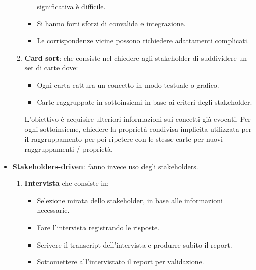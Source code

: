 \begin{itemize}
\begin{enumerate}
\begin{itemize}
                                    significativa è difficile.
                              \item Si hanno forti sforzi di convalida e integrazione.
                              \item Le corrispondenze vicine possono richiedere
                                    adattamenti complicati.
                        \end{itemize}
                  \item \textbf{Card sort}: che consiste nel chiedere agli
                        stakeholder di suddividere un set di carte dove:
                        \begin{itemize}
                              \item Ogni carta cattura un concetto in modo testuale
                                    o grafico.
                              \item Carte raggruppate in sottoinsiemi in base ai
                                    criteri degli stakeholder.
                        \end{itemize}
                        L'obiettivo è acquisire ulteriori informazioni sui
                        concetti già evocati. Per ogni sottoinsieme, chiedere la
                        proprietà condivisa implicita utilizzata per il
                        raggruppamento per poi ripetere con le stesse carte per
                        nuovi raggruppamenti / proprietà.
            \end{enumerate}
      \item \textbf{Stakeholders-driven}: fanno invece uso degli stakeholders.
            \begin{enumerate}
                  \item \textbf{Intervista} che consiste in:
                        \begin{itemize}
                              \item Selezione mirata dello stakeholder, in base
                                    alle informazioni necessarie.
                              \item Fare l'intervista registrando le risposte.
                              \item Scrivere il transcript dell'intervista e
                                    produrre subito il report.
                              \item Sottomettere all'intervistato il report per
                                    validazione.

\end{itemize}
\end{enumerate}
\end{itemize}
